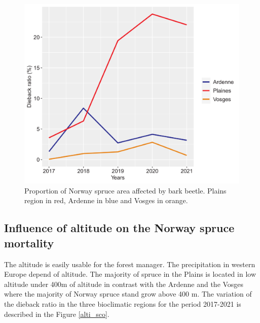 \documentclass[3p,procedia]{elsarticle}
\begin{document}


\begin{figure}[htbp] 
   \centering
   \includegraphics[width=0.6 \textwidth]{Annual_evol_Ardennes_vosges_plaines.png}
    \caption{Proportion of Norway spruce area affected by bark beetle. Plains region in red, Ardenne in blue and Vosges in orange. }
    \label{evol_gen}
\end{figure}

    


\subsection{ Influence of altitude on the Norway spruce mortality}
The altitude is easily usable for the forest manager.
The precipitation in western Europe depend of altitude. 
The majority of spruce in the Plains is located in low altitude under 400m of altitude in contrast with the Ardenne and the Vosges where the majority of Norway spruce stand grow above 400 m. 
The variation of the dieback ratio in the three bioclimatic regions for the period 2017-2021 is described in the Figure \ref{alti_sco}.
\end{document}
